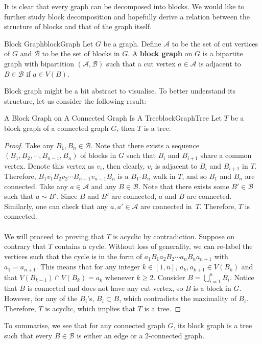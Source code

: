 \documentclass[math, code]{amznotes}
\theoremstyle{remark}
\begin{document}
It is clear that every graph can be decomposed into blocks. We would like to further study block decomposition and hopefully derive a relation between the structure of blocks and that of the graph itself.
\begin{dfnbox}{Block Graph}{blockGraph}
    Let $G$ be a graph. Define $\mathcal{A}$ to be the set of cut vertices of $G$ and $\mathcal{B}$ to be the set of blocks in $G$. A {\color{red} \textbf{block graph}} on $G$ is a bipartite graph with bipartition $(\mathcal{A}, \mathcal{B})$ such that a cut vertex $a \in \mathcal{A}$ is adjacent to $B \in \mathcal{B}$ if $a \in V(B)$.
\end{dfnbox}
Block graph might be a bit abstract to visualise. To better understand its structure, let us consider the following result:
\begin{probox}{A Block Graph on A Connected Graph Is A Tree}{blockGraphTree}
    Let $T$ be a block graph of a connected graph $G$, then $T$ is a tree.
    \tcblower
    \begin{proof}
        Take any $B_1, B_n \in \mathcal{B}$. Note that there exists a sequence $(B_1, B_{2}, \cdots, B_{n - 1}, B_n)$ of blocks in $G$ such that $B_i$ and $B_{i + 1}$ share a common vertex. Denote this vertex as $v_i$, then clearly, $v_i$ is adjacent to $B_i$ and $B_{i + 1}$ in $T$. Therefore, $B_1v_1B_2v_2\cdots B_{n - 1}v_{n - 1}B_n$ is a $B_1$-$B_n$ walk in $T$, and so $B_1$ and $B_n$ are connected. Take any $a \in \mathcal{A}$ and any $B \in \mathcal{B}$. Note that there exists some $B' \in \mathcal{B}$ such that $a \sim B'$. Since $B$ and $B'$ are connected, $a$ and $B$ are connected. Similarly, one can check that any $a, a' \in \mathcal{A}$ are connected in~$T$. Therefore, $T$ is connected.
        \\\\
        We will proceed to proving that $T$ is acyclic by contradiction. Suppose on contrary that $T$ contains a cycle. Without loss of generality, we can re-label the vertices such that the cycle is in the form of  $a_1B_1a_2B_2\cdots a_nB_na_{n + 1}$ with $a_1 = a_{n + 1}$. This means that for any integer $k \in [1, n]$, $a_k, a_{k + 1} \in V(B_k)$ and that $V(B_{k - 1}) \cap V(B_k) = a_k$ whenever $k \geq 2$. Consider $B = \bigcup_{i = 1}^{n}B_i$. Notice that $B$ is connected and does not have any cut vertex, so $B$ is a block in $G$. However, for any of the $B_i$'s, $B_i \subset B$, which contradicts the maximality of $B_i$. Therefore, $T$ is acyclic, which implies that $T$ is a tree.
    \end{proof}
\end{probox}
To summarise, we see that for any connected graph $G$, its block graph is a tree such that every $B \in \mathcal{B}$ is either an edge or a $2$-connected graph.
\end{document}
